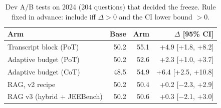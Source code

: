 \begin{table}[!t]
\centering
\footnotesize
\caption{Dev A/B tests on 2024 (204 questions) that decided the freeze. Rule fixed in advance: include iff $\Delta>0$ and the CI lower bound $>0$.}
\label{tab:devab}
\setlength{\tabcolsep}{3.5pt}
\begin{tabular}{lrrr}
\toprule
Arm & Base & Arm & $\Delta$ [95\% CI] \\
\midrule
Transcript block (PoT) & 50.2 & 55.1 & +4.9 [+1.8, +8.2] \\
Adaptive budget (PoT) & 50.2 & 52.6 & +2.3 [+1.0, +3.7] \\
Adaptive budget (CoT) & 48.5 & 54.9 & +6.4 [+2.5, +10.8] \\
RAG, v2 recipe & 50.2 & 50.4 & +0.2 [$-$2.3, +2.9] \\
RAG v3 (hybrid + JEEBench) & 50.2 & 50.6 & +0.3 [$-$2.1, +3.0] \\
\bottomrule
\end{tabular}
\end{table}

